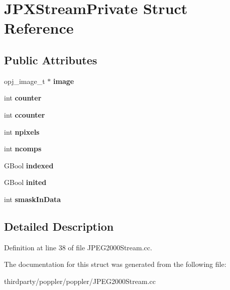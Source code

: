 \hypertarget{struct_j_p_x_stream_private}{}\section{J\+P\+X\+Stream\+Private Struct Reference}
\label{struct_j_p_x_stream_private}
\subsection*{Public Attributes}
\begin{DoxyCompactItemize}
\item 
\mbox{\label{struct_j_p_x_stream_private_ae7542388cb7d3b630bc4f6b5a2783f59}} 
opj\+\_\+image\+\_\+t $\ast$ {\bfseries image}
\item 
\mbox{\label{struct_j_p_x_stream_private_a3075b212a07e6d5c965548891af3a929}} 
int {\bfseries counter}
\item 
\mbox{\label{struct_j_p_x_stream_private_af7c119c89a5dc86adc4f63e60c4c22ef}} 
int {\bfseries ccounter}
\item 
\mbox{\label{struct_j_p_x_stream_private_a536b023e723c2b3bae2b6ebc365fb2e8}} 
int {\bfseries npixels}
\item 
\mbox{\label{struct_j_p_x_stream_private_a49add278b80b450d1b19b384598f8d3f}} 
int {\bfseries ncomps}
\item 
\mbox{\label{struct_j_p_x_stream_private_a2b7428f84b25092133c631bafd5cc23a}} 
G\+Bool {\bfseries indexed}
\item 
\mbox{\label{struct_j_p_x_stream_private_a5fadce0a93c4e2b328996297c2062950}} 
G\+Bool {\bfseries inited}
\item 
\mbox{\label{struct_j_p_x_stream_private_a487e119b81d1dbbd9ddd2f271057fc6c}} 
int {\bfseries smask\+In\+Data}
\end{DoxyCompactItemize}


\subsection{Detailed Description}


Definition at line 38 of file J\+P\+E\+G2000\+Stream.\+cc.



The documentation for this struct was generated from the following file\+:\begin{DoxyCompactItemize}
\item 
thirdparty/poppler/poppler/J\+P\+E\+G2000\+Stream.\+cc\end{DoxyCompactItemize}
